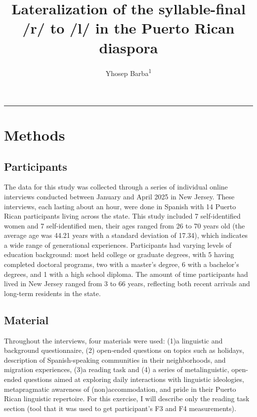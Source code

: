 \documentclass[
  man]{apa6}
\title{Lateralization of the syllable-final /r/ to /l/ in the Puerto Rican diaspora}
\author{Yhosep Barba\textsuperscript{1}}
\date{}
\affiliation{\vspace{0.5cm}\textsuperscript{1} Rutgers University}
\begin{document}
\maketitle

\begin{center}\rule{0.5\linewidth}{0.5pt}\end{center}

\section{Methods}\label{methods}

\subsection{Participants}\label{participants}

The data for this study was collected through a series of individual online interviews conducted between January and April 2025 in New Jersey. These interviews, each lasting about an hour, were done in Spanish with 14 Puerto Rican participants living across the state. This study included 7 self-identified women and 7 self-identified men, their ages ranged from 26 to 70 years old (the average age was 44.21 years with a standard deviation of 17.34), which indicates a wide range of generational experiences. Participants had varying levels of education background: most held college or graduate degrees, with 5 having completed doctoral programs, two with a master's degree, 6 with a bachelor's degrees, and 1 with a high school diploma. The amount of time participants had lived in New Jersey ranged from 3 to 66 years, reflecting both recent arrivals and long-term residents in the state.

\subsection{Material}\label{material}

Throughout the interviews, four materials were used: (1)a linguistic and background questionnaire, (2) open-ended questions on topics such as holidays, description of Spanish-speaking communities in their neighborhoods, and migration experiences, (3)a reading task and (4) a series of metalinguistic, open-ended questions aimed at exploring daily interactions with linguistic ideologies, metapragmatic awareness of (non)accommodation, and pride in their Puerto Rican linguistic repertoire. For this exercise, I will describe only the reading task section (tool that it was used to get participant's F3 and F4 measurements).
\end{document}
